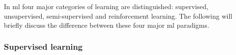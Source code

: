 


In \gls{ml} four major categories of learning are distinguished: supervised, unsupervised, semi-supervised and reinforcement learning.
The following will briefly discuss the difference between these four major \gls{ml} paradigms.



\subsubsection{Supervised learning}
\label{subsubsec:processing_signals_ml_and_dl_tyes_of_learning_supervision_supervised}

